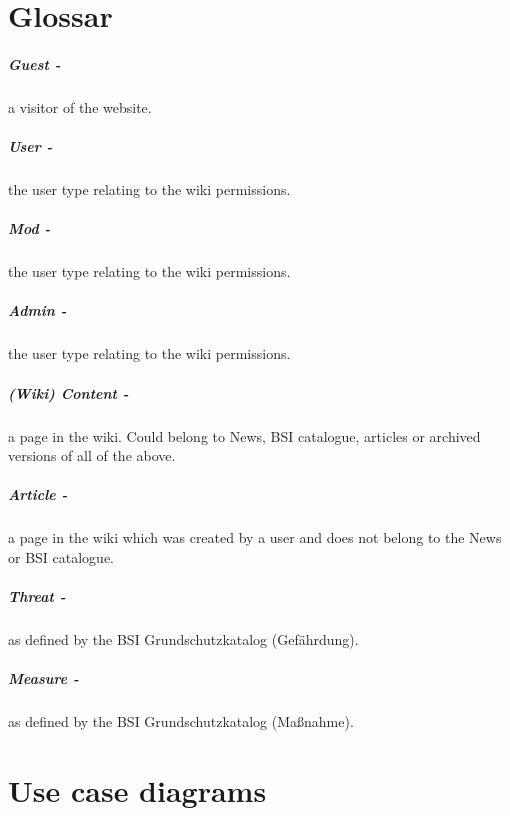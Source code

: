 \appendix
\chapter{Glossar}

\paragraph{Guest -} a visitor of the website.
\paragraph{User -} the user type relating to the wiki permissions.
\paragraph{Mod -} the user type relating to the wiki permissions. 
\paragraph{Admin -} the user type relating to the wiki permissions. 
\paragraph{(Wiki) Content -} a page in the wiki. Could belong to News, BSI catalogue, articles or archived versions of all of the above.
\paragraph{Article -} a page in the wiki which was created by a user and does not belong to the News or BSI catalogue.
\paragraph{Threat -} as defined by the BSI Grundschutzkatalog (Gef\"ahrdung).
\paragraph{Measure -} as defined by the BSI Grundschutzkatalog (Ma\ss nahme).

\chapter{Use case diagrams}

